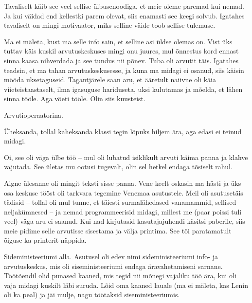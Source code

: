 
Tavaliselt käib see veel sellise ülbusenoodiga, et meie oleme 
paremad kui nemad. Ja kui väidad end kellestki parem olevat, siis 
enamasti see keegi solvub. Igatahes tavaliselt on mingi motivaator, miks 
selline väide toob sellise tulemuse. 


Ma ei mäleta, kust ma selle info sain, et selline asi üldse olemas on. Vist 
üks tuttav käis kuskil arvutuskeskuses mingi onu juures, mul õnnestus kord ennast 
sinna kaasa nihverdada ja see tundus nii põnev. Tuba oli arvutit täis. Igatahes 
teadsin, et ma tahan arvutuskeskusesse, ja kuna ma midagi ei osanud, siis 
käisin mööda uksetaguseid. Tagantjärele saan aru, et ääretult naiivne 
oli käia viieteistaastaselt, ilma igasuguse 
hariduseta, uksi kulutamas ja mõelda, et lähen sinna tööle. Aga võeti tööle. Olin siis kuusteist.


Arvutioperaatorina. 


Üheksanda, tollal kaheksanda klassi tegin lõpuks hiljem ära, aga edasi ei 
teinud midagi. 


Oi, see oli väga ülbe töö -- mul oli lubatud isiklikult 
arvuti käima panna ja klahve vajutada. See ületas mu ootusi tugevalt, olin sel 
hetkel endaga tõsiselt rahul. 

Algne ülesanne oli mingit teksti sisse panna. Vene keelt oskasin ma hästi ja 
üks osa keskuse tööst oli tarkvara tegemine Venemaa 
asutustele. Meil oli asutusetäis tädisid -- tollal oli mul tunne, et täiesti 
surmalähedased vanamammid, sellised neljakümnesed -- ja 
nemad programmeerisid midagi, millest me (paar 
poissi tuli veel) väga aru ei saanud. Kui nad kirjutasid kasutajajuhendi käsitsi paberile, siis meie pidime selle 
arvutisse sisestama ja välja printima. See tõi paratamatult õiguse ka
printerit näppida.


Sideministeeriumi alla. Asutusel oli edev nimi 
sideministeeriumi info- ja arvutuskeskus, mis oli siseministeeriumi endaga äravahetamiseni sarnane. 
Töötõendil olid punased kaaned, mis tegid nii mõnegi vajaliku 
töö ära, kui oli vaja midagi kuskilt läbi suruda. Lõid oma kaaned lauale (ma ei mäleta, kas Lenin oli ka peal)
ja jäi mulje, nagu töötaksid siseministeeriumis. 


